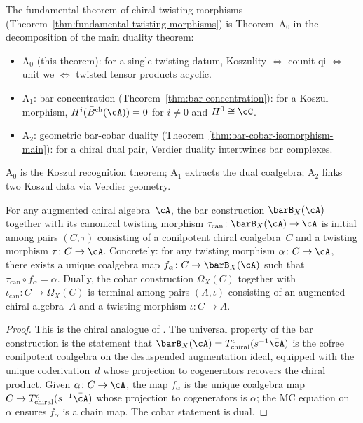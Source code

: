 \begin{remark}\label{rem:theorem-A-decomposition}
The fundamental theorem of chiral twisting morphisms
(Theorem~\ref{thm:fundamental-twisting-morphisms}) is
Theorem~$\mathrm{A}_0$ in the decomposition of the main
duality theorem:
\begin{itemize}
\item \emph{$\mathrm{A}_0$} (this theorem): for a single
  twisting datum, Koszulity $\Leftrightarrow$ counit qi
  $\Leftrightarrow$ unit we $\Leftrightarrow$ twisted tensor
  products acyclic.
\item \emph{$\mathrm{A}_1$}: bar concentration
  (Theorem~\ref{thm:bar-concentration}): for a Koszul morphism,
  $H^i(\bar{B}^{\mathrm{ch}}(\cA)) = 0$ for $i \neq 0$ and
  $H^0 \cong \cC$.
\item \emph{$\mathrm{A}_2$}: geometric bar-cobar duality
  (Theorem~\ref{thm:bar-cobar-isomorphism-main}): for a chiral
  dual pair, Verdier duality intertwines bar complexes.
\end{itemize}
$\mathrm{A}_0$ is the Koszul recognition theorem;
$\mathrm{A}_1$ extracts the dual coalgebra;
$\mathrm{A}_2$ links two Koszul data via Verdier geometry.
\end{remark}

\begin{proposition}
\label{prop:bar-universal-property}
For any augmented chiral algebra~$\cA$, the bar construction
$\barB_X(\cA)$ together with its canonical twisting morphism
$\tau_{\mathrm{can}} \colon \barB_X(\cA) \to \cA$
is initial among pairs $(C, \tau)$ consisting of a conilpotent chiral
coalgebra~$C$ and a twisting morphism $\tau \colon C \to \cA$.
Concretely: for any twisting morphism $\alpha \colon C \to \cA$,
there exists a unique coalgebra map
$f_\alpha \colon C \to \barB_X(\cA)$
such that $\tau_{\mathrm{can}} \circ f_\alpha = \alpha$.
Dually, the cobar construction $\Omega_X(C)$ together with
$\iota_{\mathrm{can}} \colon C \to \Omega_X(C)$ is terminal among
pairs $(A, \iota)$ consisting of an augmented chiral algebra~$A$
and a twisting morphism $\iota \colon C \to A$.
\end{proposition}

\begin{proof}
This is the chiral analogue of
\cite[Theorem~2.2.8 and Proposition~2.2.7]{LV12}.
The universal property of the bar construction is the statement
that $\barB_X(\cA) = T^c_{\mathrm{chiral}}(s^{-1}\bar{\cA})$
is the cofree conilpotent coalgebra on the desuspended
augmentation ideal, equipped with the unique coderivation~$d$
whose projection to cogenerators recovers the chiral product.
Given $\alpha \colon C \to \cA$, the map $f_\alpha$ is the
unique coalgebra map $C \to T^c_{\mathrm{chiral}}(s^{-1}\bar{\cA})$
whose projection to cogenerators is $\alpha$; the MC equation
on~$\alpha$ ensures $f_\alpha$ is a chain map.  The cobar
statement is dual.
\end{proof}

